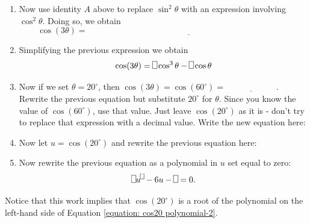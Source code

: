 \documentclass[11pt]{article}
\newenvironment{task}
	{\begin{mdframed}[linecolor=lightgray, linewidth=3pt]\raggedright}
	{\end{mdframed}}
\theoremstyle{definition}
\begin{document}
\begin{task}
\begin{enumerate}
    \item Now use identity $A$ above to replace $\sin^2\theta$ with an expression involving $\cos^2\theta$. Doing so, we obtain
      \[ \cos(3\theta) =\underline{\hspace{4in}} \]
    \item Simplifying the previous expression we obtain
      \[ \cos(3\theta) = \framebox(5,8){}\cos^3\theta - \framebox(5,8){}\cos\theta\]
    \item Now if we set $\theta = 20^\circ$, then $\cos(3\theta) = \cos(60^\circ) = \underline{\hspace{1in}}$. Rewrite the previous
      equation but substitute $20^\circ$ for $\theta$. Since you know the value of $\cos(60^\circ)$, use that value. Just leave
      $\cos(20^\circ)$ as it is - don't try to replace that expression with a decimal value. Write
      the new equation here:
      \[ \]
    \item Now let $u = \cos(20^\circ)$ and rewrite the previous equation here:
      \[ \]
    \item Now rewrite the previous equation as a polynomial in $u$ set equal to zero:
      \begin{equation}
       \framebox(5,8){}u^{\framebox(4,6){}} - 6u - \framebox(5,8){} = 0. 
        \label{equation: cos20 polynomial-2}
      \end{equation}
  \end{enumerate}
  Notice that this work implies that $\cos(20^\circ)$ is a root of the polynomial on the left-hand side of Equation \ref{equation: cos20 polynomial-2}.
\end{task}
\end{document}
